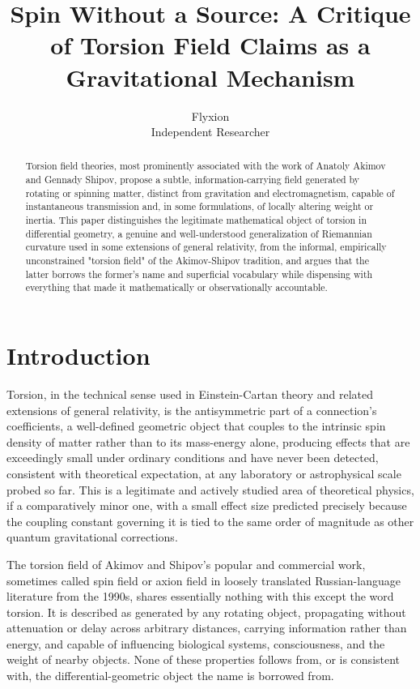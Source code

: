 \documentclass[11pt]{article}
\title{Spin Without a Source: A Critique of Torsion Field Claims as a Gravitational Mechanism}
\author{Flyxion \\ \small Independent Researcher}
\date{}
\begin{document}
\maketitle

\begin{abstract}
Torsion field theories, most prominently associated with the work of Anatoly Akimov and Gennady Shipov, propose a subtle, information-carrying field generated by rotating or spinning matter, distinct from gravitation and electromagnetism, capable of instantaneous transmission and, in some formulations, of locally altering weight or inertia. This paper distinguishes the legitimate mathematical object of torsion in differential geometry, a genuine and well-understood generalization of Riemannian curvature used in some extensions of general relativity, from the informal, empirically unconstrained "torsion field" of the Akimov-Shipov tradition, and argues that the latter borrows the former's name and superficial vocabulary while dispensing with everything that made it mathematically or observationally accountable.
\end{abstract}

\section{Introduction}

Torsion, in the technical sense used in Einstein-Cartan theory and related extensions of general relativity, is the antisymmetric part of a connection's coefficients, a well-defined geometric object that couples to the intrinsic spin density of matter rather than to its mass-energy alone, producing effects that are exceedingly small under ordinary conditions and have never been detected, consistent with theoretical expectation, at any laboratory or astrophysical scale probed so far. This is a legitimate and actively studied area of theoretical physics, if a comparatively minor one, with a small effect size predicted precisely because the coupling constant governing it is tied to the same order of magnitude as other quantum gravitational corrections.

The torsion field of Akimov and Shipov's popular and commercial work, sometimes called spin field or axion field in loosely translated Russian-language literature from the 1990s, shares essentially nothing with this except the word torsion. It is described as generated by any rotating object, propagating without attenuation or delay across arbitrary distances, carrying information rather than energy, and capable of influencing biological systems, consciousness, and the weight of nearby objects. None of these properties follows from, or is consistent with, the differential-geometric object the name is borrowed from.
\end{document}
